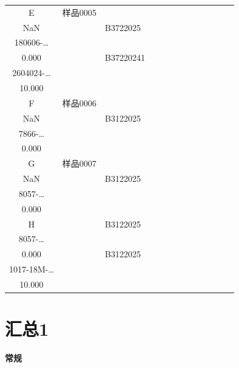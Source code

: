 \documentclass[UTF8,10pt,a4paper,fontset=fandol]{ctexart}
\newcommand{\fieldvalue}[1]{#1}
\begin{document}
\begin{center}
\begin{tabular}{c|p{1.05cm}|p{1.05cm}|p{1.05cm}|p{1.05cm}|p{1.05cm}|p{1.05cm}|p{1.05cm}|p{1.05cm}|p{1.05cm}|p{1.05cm}|p{1.05cm}|p{1.05cm}}
&&&&&&&\\ \hline
E&
\fieldvalue{\scriptsize 样品0005\\NaN}
&&
\fieldvalue{\scriptsize B3722025\\180606-\ldots\\0.000}
&&
\fieldvalue{\scriptsize B37220241\\2604024-\ldots\\10.000}
&&&&&&&\\ \hline
F&
\fieldvalue{\scriptsize 样品0006\\NaN}
&&
\fieldvalue{\scriptsize B3122025\\7866-\ldots\\0.000}
&&&&&&&&&&&\\ \hline
G&
\fieldvalue{\scriptsize 样品0007\\NaN}
&&
\fieldvalue{\scriptsize B3122025\\8057-\ldots\\0.000}
&&&&&&&&&&&\\ \hline
H&&
\fieldvalue{\scriptsize B3122025\\8057-\ldots\\0.000}
&&
\fieldvalue{\scriptsize B3122025\\1017-18M-\ldots\\10.000}
&&&&&&\\ \hline
\end{tabular}
\end{center}

\section*{汇总1}

\textbf{常规}
\end{document}
